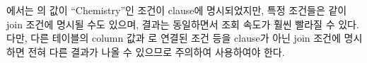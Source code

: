 에서는 의 값이 ``Chemistry''인 조건이  clause에 명시되었지만, 특정 조건들은 \과 같이 join 조건에 명시될 수도 있으며, 결과는 동일하면서 조회 속도가 훨씬 빨라질 수 있다. 다만, 다른 테이블의 column 값과 로 연결된 조건 등을  clause가 아닌 join 조건에 명시하면 전혀 다른 결과가 나올 수 있으므로 주의하여 사용하여야 한다.
